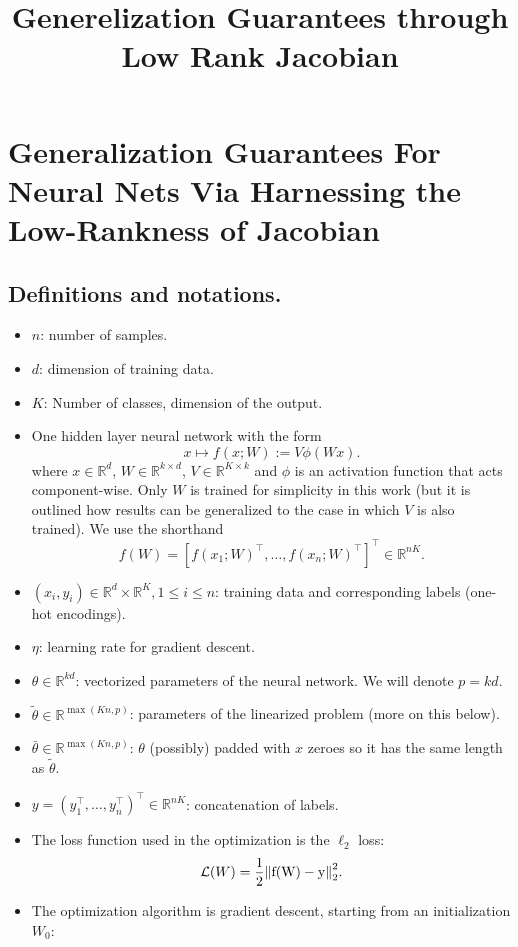 \documentclass[a4paper]{article}
\title{Generelization Guarantees through Low Rank  Jacobian}
\author{}
\date{}
\newcommand{\R}{\mathbb{R}}
\begin{document}
\maketitle


\section{Generalization Guarantees For Neural Nets Via Harnessing the Low-Rankness of Jacobian}


\subsection*{Definitions and notations.}
\begin{itemize}
\item $n$: number of samples.
\item $d$: dimension of training data.
\item $K$: Number of classes, dimension of the output.
\item One hidden layer neural network with the form
    \[
    x \mapsto f(x ; W):= V \phi(W x).
    \] 
    where $x\in\R^d$, $W\in \R^{k\times d}$, $V\in \R^{K\times k}$ and $\phi$ is an activation function that acts component-wise. Only $W$ is trained for simplicity in this work (but it is outlined how results can be generalized to the case in which $V$ is also trained). We use the shorthand
    \[
        f(W) = [f(x_1;W)^\top, \dots, f(x_n;W)^\top]^\top \in \R^{nK}.
    \] 
\item $(x_i, y_i) \in \R^d\times\R^K, 1\leq i\leq n$: training data and corresponding labels (one-hot encodings). 
\item $\eta$: learning rate for gradient descent.
\item $\theta \in \R^{kd}$: vectorized parameters of the neural network. We will denote $p=kd$.
\item $\tilde{\theta} \in \R^{\max(Kn,p)}$: parameters of the linearized problem (more on this below).
\item $\bar{\theta} \in \R^{\max(Kn,p)}$: $\theta$ (possibly) padded with $x$ zeroes so it has the same length as $\tilde{\theta}$.
\item $y = (y_1^\top,\dots, y_n^\top)^\top \in \R^{nK}$: concatenation of labels.
\item The loss function used in the optimization is the $\ell_2$ loss:
    \[
        \mathcal{L}(W) = \frac{1}{2} \mathrm{\left\lVert f(W)-y\right\rVert}_2^2.
    \] 
\item The optimization algorithm is gradient descent, starting from an initialization $W_0$:

\end{itemize}
\end{document}
